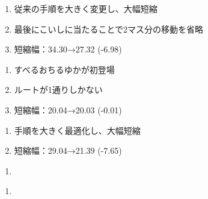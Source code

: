 \begin{enumerate}[label={\sarrow}]
\item 従来の手順を大きく変更し、大幅短縮
\item 最後にこいしに当たることで2マス分の移動を省略
\item 短縮幅：34.30→27.32 (-6.98)
\end{enumerate}



\begin{enumerate}[label={\sarrow}]
\item すべるおちるゆかが初登場
\item ルートが1通りしかない
\item 短縮幅：20.04→20.03 (-0.01)
\end{enumerate}



\begin{enumerate}[label={\sarrow}]
\item 手順を大きく最適化し、大幅短縮
\item 短縮幅：29.04→21.39 (-7.65)
\end{enumerate}



\begin{enumerate}[label={\sarrow}]
\item
\end{enumerate}



\begin{enumerate}[label={\sarrow}]
\item
\end{enumerate}



